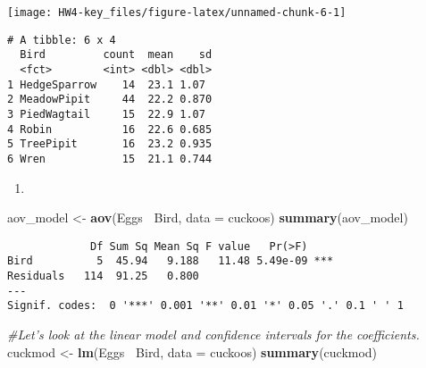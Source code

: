 \documentclass[]{article}
\newenvironment{Shaded}{\begin{snugshade}}{\end{snugshade}}
\newcommand{\KeywordTok}[1]{\textcolor[rgb]{0.13,0.29,0.53}{\textbf{#1}}}
\newcommand{\DataTypeTok}[1]{\textcolor[rgb]{0.13,0.29,0.53}{#1}}
\newcommand{\StringTok}[1]{\textcolor[rgb]{0.31,0.60,0.02}{#1}}
\newcommand{\CommentTok}[1]{\textcolor[rgb]{0.56,0.35,0.01}{\textit{#1}}}
\newcommand{\OtherTok}[1]{\textcolor[rgb]{0.56,0.35,0.01}{#1}}
\newcommand{\OperatorTok}[1]{\textcolor[rgb]{0.81,0.36,0.00}{\textbf{#1}}}
\newcommand{\NormalTok}[1]{#1}
\begin{document}
\texttt{[image: HW4-key\_files/figure-latex/unnamed-chunk-6-1]}

\begin{Shaded}
\end{Shaded}

\begin{verbatim}
# A tibble: 6 x 4
  Bird         count  mean    sd
  <fct>        <int> <dbl> <dbl>
1 HedgeSparrow    14  23.1 1.07 
2 MeadowPipit     44  22.2 0.870
3 PiedWagtail     15  22.9 1.07 
4 Robin           16  22.6 0.685
5 TreePipit       16  23.2 0.935
6 Wren            15  21.1 0.744
\end{verbatim}

\begin{enumerate}
\def\labelenumi{\alph{enumi}.}
\setcounter{enumi}{1}
\item
\end{enumerate}

\begin{Shaded}
\begin{Highlighting}[]
\NormalTok{aov_model <-}\StringTok{ }\KeywordTok{aov}\NormalTok{(Eggs }\OperatorTok{~}\NormalTok{Bird, }\DataTypeTok{data =}\NormalTok{ cuckoos)}
\KeywordTok{summary}\NormalTok{(aov_model)}
\end{Highlighting}
\end{Shaded}

\begin{verbatim}
             Df Sum Sq Mean Sq F value   Pr(>F)    
Bird          5  45.94   9.188   11.48 5.49e-09 ***
Residuals   114  91.25   0.800                     
---
Signif. codes:  0 '***' 0.001 '**' 0.01 '*' 0.05 '.' 0.1 ' ' 1
\end{verbatim}

\begin{Shaded}
\begin{Highlighting}[]
\CommentTok{#Let's look at the linear model and confidence intervals for the coefficients.}
\NormalTok{cuckmod <-}\StringTok{ }\KeywordTok{lm}\NormalTok{(Eggs }\OperatorTok{~}\NormalTok{Bird, }\DataTypeTok{data =}\NormalTok{ cuckoos)}
\KeywordTok{summary}\NormalTok{(cuckmod)}
\end{Highlighting}
\end{Shaded}
\end{document}
